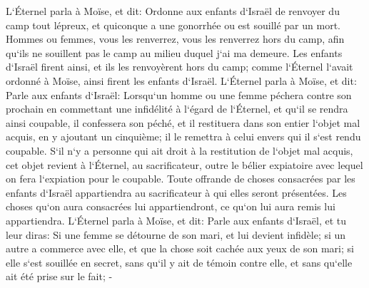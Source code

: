 \verse L`Éternel parla à Moïse, et dit: 
\verse Ordonne aux enfants d`Israël de renvoyer du camp tout lépreux, et quiconque a une gonorrhée ou est souillé par un mort. 
\verse Hommes ou femmes, vous les renverrez, vous les renverrez hors du camp, afin qu`ils ne souillent pas le camp au milieu duquel j`ai ma demeure. 
\verse Les enfants d`Israël firent ainsi, et ils les renvoyèrent hors du camp; comme l`Éternel l`avait ordonné à Moïse, ainsi firent les enfants d`Israël. 
\verse L`Éternel parla à Moïse, et dit: 
\verse Parle aux enfants d`Israël: Lorsqu`un homme ou une femme péchera contre son prochain en commettant une infidélité à l`égard de l`Éternel, et qu`il se rendra ainsi coupable, 
\verse il confessera son péché, et il restituera dans son entier l`objet mal acquis, en y ajoutant un cinquième; il le remettra à celui envers qui il s`est rendu coupable. 
\verse S`il n`y a personne qui ait droit à la restitution de l`objet mal acquis, cet objet revient à l`Éternel, au sacrificateur, outre le bélier expiatoire avec lequel on fera l`expiation pour le coupable. 
\verse Toute offrande de choses consacrées par les enfants d`Israël appartiendra au sacrificateur à qui elles seront présentées. 
\verse Les choses qu`on aura consacrées lui appartiendront, ce qu`on lui aura remis lui appartiendra. 
\verse L`Éternel parla à Moïse, et dit: 
\verse Parle aux enfants d`Israël, et tu leur diras: Si une femme se détourne de son mari, et lui devient infidèle; 
\verse si un autre a commerce avec elle, et que la chose soit cachée aux yeux de son mari; si elle s`est souillée en secret, sans qu`il y ait de témoin contre elle, et sans qu`elle ait été prise sur le fait; - 
